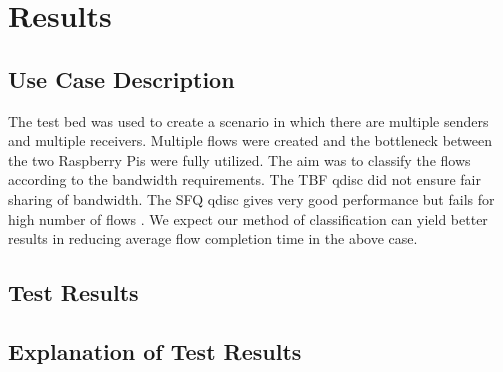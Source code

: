 \chapter{Results}

\section{Use Case Description}
The test bed was used to create a scenario in which there are multiple
senders and multiple receivers. Multiple flows were created and the
bottleneck between the two Raspberry Pis were fully utilized. The aim
was to classify the flows according to the bandwidth requirements. The
TBF qdisc did not ensure fair sharing of bandwidth. The SFQ qdisc gives
very good performance but fails for high number of flows \cite{lartc}. We
expect our method of classification can yield better results in reducing
average flow completion time in the above case.

\section{Test Results}

\section{Explanation of Test Results}
